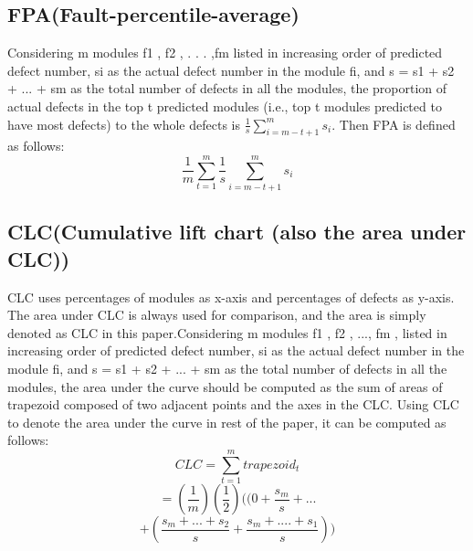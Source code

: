 \subsection{FPA(Fault-percentile-average)}
Considering m modules f1 , f2 , . . . ,fm listed in increasing order of predicted defect number, si as the actual defect number in the module fi, and s = s1 + s2 + ... + sm as the total number
of defects in all the modules, the proportion of actual defects in the top t predicted modules (i.e., top t modules predicted to have most defects) to the whole defects is \(\frac{1}{s}\sum_{i=m-t+1}^{m}s_i\). Then FPA is defined as follows:
\[\frac{1}{m}\sum_{t=1}^{m} \frac{1}{s}\sum_{i=m-t+1}^{m}s_i\] 

\subsection{CLC(Cumulative lift chart (also the area under CLC))}

\cite{clc}CLC uses percentages of modules as x-axis and percentages of defects as y-axis. The area under CLC is always used for comparison, and the area is simply denoted as CLC in this paper.Considering m modules f1 , f2 , ..., fm , listed in increasing order of predicted defect number, si as the actual defect number in the module fi, and s = s1 + s2 + ... + sm as the total number of defects in all the modules, the area under the curve should be computed as the sum of areas of trapezoid composed of two adjacent points and the axes in the CLC. Using CLC to denote
the area under the curve in rest of the paper, it can be computed as follows:
\[CLC = \sum_{t=1}^{m}trapezoid_t\]
\[=(\frac{1}{m})(\frac{1}{2})((0+\frac{s_m}{s}+...\]
\[+(\frac{s_m+...+s_2}{s}+\frac{s_m+....+s_1}{s}))\]

